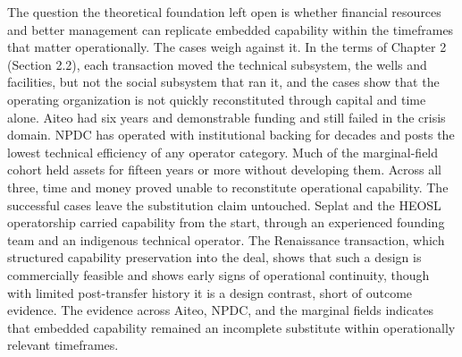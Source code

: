 \documentclass[twoside,fontset=lmodern]{mitthesis}
\begin{document}
The question the theoretical foundation left open is whether financial
resources and better management can replicate embedded capability within
the timeframes that matter operationally. The cases weigh against it. In
the terms of Chapter 2 (Section 2.2), each transaction moved the
technical subsystem, the wells and facilities, but not the social
subsystem that ran it, and the cases show that the operating
organization is not quickly reconstituted through capital and time
alone. Aiteo had six years and demonstrable funding and still failed in
the crisis domain. NPDC has operated with institutional backing for
decades and posts the lowest technical efficiency of any operator
category. Much of the marginal-field cohort held assets for fifteen
years or more without developing them. Across all three, time and money
proved unable to reconstitute operational capability. The successful
cases leave the substitution claim untouched. Seplat and the HEOSL
operatorship carried capability from the start, through an experienced
founding team and an indigenous technical operator. The Renaissance
transaction, which structured capability preservation into the deal,
shows that such a design is commercially feasible and shows early signs
of operational continuity, though with limited post-transfer history it
is a design contrast, short of outcome evidence. The evidence across
Aiteo, NPDC, and the marginal fields indicates that embedded capability
remained an incomplete substitute within operationally relevant
timeframes.
\end{document}
